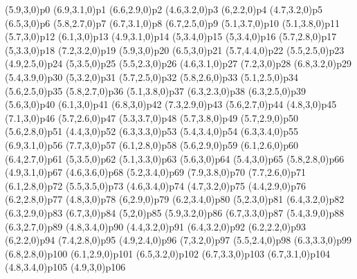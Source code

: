 \psPoint(5.9,3,0){p0}
\psPoint(6.9,3.1,0){p1}
\psPoint(6.6,2.9,0){p2}
\psPoint(4.6,3.2,0){p3}
\psPoint(6,2.2,0){p4}
\psPoint(4.7,3.2,0){p5}
\psPoint(6.5,3,0){p6}
\psPoint(5.8,2.7,0){p7}
\psPoint(6.7,3.1,0){p8}
\psPoint(6.7,2.5,0){p9}
\psPoint(5.1,3.7,0){p10}
\psPoint(5.1,3.8,0){p11}
\psPoint(5.7,3,0){p12}
\psPoint(6.1,3,0){p13}
\psPoint(4.9,3.1,0){p14}
\psPoint(5,3.4,0){p15}
\psPoint(5,3.4,0){p16}
\psPoint(5.7,2.8,0){p17}
\psPoint(5,3.3,0){p18}
\psPoint(7.2,3.2,0){p19}
\psPoint(5.9,3,0){p20}
\psPoint(6.5,3,0){p21}
\psPoint(5.7,4.4,0){p22}
\psPoint(5.5,2.5,0){p23}
\psPoint(4.9,2.5,0){p24}
\psPoint(5,3.5,0){p25}
\psPoint(5.5,2.3,0){p26}
\psPoint(4.6,3.1,0){p27}
\psPoint(7.2,3,0){p28}
\psPoint(6.8,3.2,0){p29}
\psPoint(5.4,3.9,0){p30}
\psPoint(5,3.2,0){p31}
\psPoint(5.7,2.5,0){p32}
\psPoint(5.8,2.6,0){p33}
\psPoint(5.1,2.5,0){p34}
\psPoint(5.6,2.5,0){p35}
\psPoint(5.8,2.7,0){p36}
\psPoint(5.1,3.8,0){p37}
\psPoint(6.3,2.3,0){p38}
\psPoint(6.3,2.5,0){p39}
\psPoint(5.6,3,0){p40}
\psPoint(6.1,3,0){p41}
\psPoint(6.8,3,0){p42}
\psPoint(7.3,2.9,0){p43}
\psPoint(5.6,2.7,0){p44}
\psPoint(4.8,3,0){p45}
\psPoint(7.1,3,0){p46}
\psPoint(5.7,2.6,0){p47}
\psPoint(5.3,3.7,0){p48}
\psPoint(5.7,3.8,0){p49}
\psPoint(5.7,2.9,0){p50}
\psPoint(5.6,2.8,0){p51}
\psPoint(4.4,3,0){p52}
\psPoint(6.3,3.3,0){p53}
\psPoint(5.4,3.4,0){p54}
\psPoint(6.3,3.4,0){p55}
\psPoint(6.9,3.1,0){p56}
\psPoint(7.7,3,0){p57}
\psPoint(6.1,2.8,0){p58}
\psPoint(5.6,2.9,0){p59}
\psPoint(6.1,2.6,0){p60}
\psPoint(6.4,2.7,0){p61}
\psPoint(5,3.5,0){p62}
\psPoint(5.1,3.3,0){p63}
\psPoint(5.6,3,0){p64}
\psPoint(5.4,3,0){p65}
\psPoint(5.8,2.8,0){p66}
\psPoint(4.9,3.1,0){p67}
\psPoint(4.6,3.6,0){p68}
\psPoint(5.2,3.4,0){p69}
\psPoint(7.9,3.8,0){p70}
\psPoint(7.7,2.6,0){p71}
\psPoint(6.1,2.8,0){p72}
\psPoint(5.5,3.5,0){p73}
\psPoint(4.6,3.4,0){p74}
\psPoint(4.7,3.2,0){p75}
\psPoint(4.4,2.9,0){p76}
\psPoint(6.2,2.8,0){p77}
\psPoint(4.8,3,0){p78}
\psPoint(6,2.9,0){p79}
\psPoint(6.2,3.4,0){p80}
\psPoint(5,2.3,0){p81}
\psPoint(6.4,3.2,0){p82}
\psPoint(6.3,2.9,0){p83}
\psPoint(6.7,3,0){p84}
\psPoint(5,2,0){p85}
\psPoint(5.9,3.2,0){p86}
\psPoint(6.7,3.3,0){p87}
\psPoint(5.4,3.9,0){p88}
\psPoint(6.3,2.7,0){p89}
\psPoint(4.8,3.4,0){p90}
\psPoint(4.4,3.2,0){p91}
\psPoint(6.4,3.2,0){p92}
\psPoint(6.2,2.2,0){p93}
\psPoint(6,2.2,0){p94}
\psPoint(7.4,2.8,0){p95}
\psPoint(4.9,2.4,0){p96}
\psPoint(7,3.2,0){p97}
\psPoint(5.5,2.4,0){p98}
\psPoint(6.3,3.3,0){p99}
\psPoint(6.8,2.8,0){p100}
\psPoint(6.1,2.9,0){p101}
\psPoint(6.5,3.2,0){p102}
\psPoint(6.7,3.3,0){p103}
\psPoint(6.7,3.1,0){p104}
\psPoint(4.8,3.4,0){p105}
\psPoint(4.9,3,0){p106}
